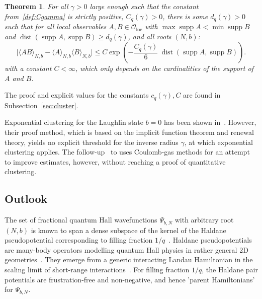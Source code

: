 \documentclass[letterpaper, DIV=17]{scrartcl}
\newtheorem{theorem}{Theorem}[section]  %
\numberwithin{equation}{section}
\theoremstyle{definition}
\DeclareMathOperator{\dist}{dist}
\DeclareMathOperator{\supp}{supp}
\newcommand{\loc}{\mathrm{loc}}
\begin{document}
\begin{theorem} \label{thm:clustering}
For all $\gamma > 0 $ large enough such that the constant from~\eqref{def:Cgamma} is strictly positive, $ C_q(\gamma) > 0 $, there is some $ d_q(\gamma) > 0 $ such that for all local observables $ A, B \in \mathcal{O}_\loc $ with $\max \supp A < \min \supp B$ and $ \dist(\supp A,\supp B) \geq d_q(\gamma) $, and   all roots $ (N,b) $:	
			\begin{equation} \label{exponential clustering}
				\vert \langle A B\rangle_{N,b} - \langle A  \rangle_{N,b} \langle B  \rangle_{N,b} \vert
				\leq C \exp\left(- \frac{C_q(\gamma)}{6} \ \dist(\supp A,\supp B) \right) . 
			\end{equation}
			with a constant $ C < \infty $, which only depends on the cardinalities of the support of $ A $ and $ B $.
		\end{theorem}
The proof and explicit values for the constants $ c_q(\gamma)  , C $ are found in Subsection~\ref{sec:cluster}. 

Exponential clustering for the Laughlin state $ b = 0 $ has been shown in~\cite{jansen2009symmetry}. However, their proof method, which is based on the implicit function theorem and renewal theory, yields no explicit threshold for the inverse radius $\gamma$, at which exponential clustering applies. The follow-up~\cite{jansen2012fermionic} to \cite{jansen2009symmetry} uses Coulomb-gas methods for an attempt to improve estimates, however, without reaching a proof of quantitative clustering.




\subsection{Outlook}  
The set of fractional quantum Hall wavefunctions $ \Psi_{b,N} $ with arbitrary root $(N,b) $ is known to span a dense subspace of the kernel of the Haldane pseudopotential corresponding to filling fraction $ 1/q $~\cite{Rezayi:1994aa,Mazaheri:2015aa}. Haldane pseudopotentials are many-body operators modelling quantum Hall physics in rather general 2D geometries~\cite{PhysRevLett.51.605,QHEOxford2003,Ortiz:2013aa,Bandyopadhyay:2020aa,schossler2022inner}.  They emerge from a generic interacting Landau Hamiltonian in the scaling limit of short-range interactions~\cite{seiringer:2020}.  
For filling fraction $ 1/q $,  the Haldane pair potentials are frustration-free and non-negative, and hence 'parent Hamiltonians' for $  \Psi_{b,N} $.  
\end{document}
